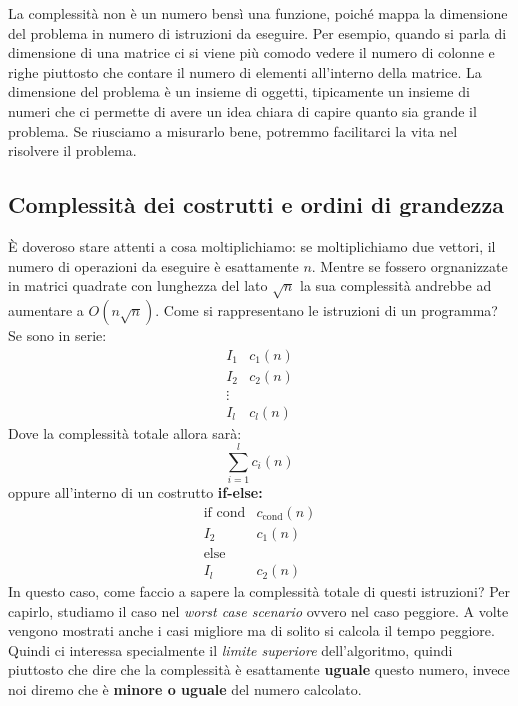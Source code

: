 \documentclass[a4paper]{article}
\begin{document}
\vspace{1em}
\noindent
La complessità non è un numero bensì una funzione, poiché mappa la dimensione del problema in numero di istruzioni da eseguire. Per esempio, quando si parla di dimensione di una matrice ci si viene più comodo vedere il numero di colonne e righe piuttosto che contare il numero di elementi all'interno della matrice. La dimensione del problema è un insieme di oggetti, tipicamente un insieme di numeri che ci permette di avere un idea chiara di capire quanto sia grande il problema. Se riusciamo a misurarlo bene, potremmo facilitarci la vita nel risolvere il problema.

\subsection{Complessità dei costrutti e ordini di grandezza}

È doveroso stare attenti a cosa moltiplichiamo: se moltiplichiamo due vettori, il numero di operazioni da eseguire è esattamente $n$. Mentre se fossero orgnanizzate in matrici quadrate con lunghezza del lato $\sqrt{n}$ la sua complessità andrebbe ad aumentare a $O(n\sqrt{n})$.
Come si rappresentano le istruzioni di un programma?
Se sono in serie:
\[\begin{matrix}
  I_1 & c_1(n)\\
  I_2 & c_2(n)\\
  \vdots\\
  I_l & c_l(n)
\end{matrix}\]
Dove la complessità totale allora sarà:
\[\sum_{i=1}^l c_i(n)\]
oppure all'interno di un costrutto \textbf{if-else:}
\[\begin{matrix}
  \text{if cond} & c_{\text{cond}}(n)\\
  I_2 & c_1(n)\\
  \text{else}\\
  I_l & c_2(n)
\end{matrix}\]
In questo caso, come faccio a sapere la complessità totale di questi istruzioni? Per capirlo, studiamo il caso nel \textit{worst case scenario} ovvero nel caso peggiore. A volte vengono mostrati anche i casi migliore ma di solito si calcola il tempo peggiore. Quindi ci interessa specialmente il \textit{limite superiore} dell'algoritmo, quindi piuttosto che dire che la complessità è esattamente \textbf{uguale} questo numero, invece noi diremo che è \textbf{minore o uguale} del numero calcolato.
\end{document}
